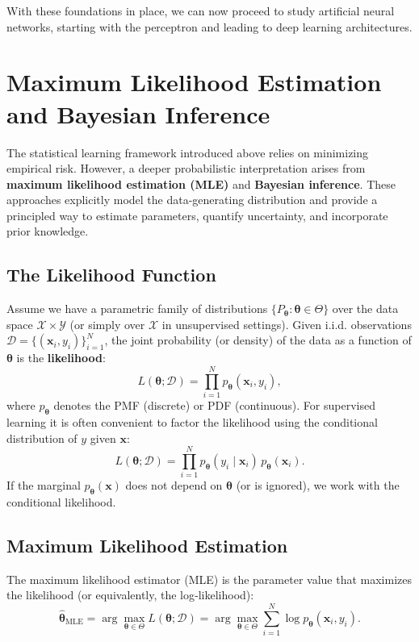 \documentclass{tufte-handout}
\begin{document}
With these foundations in place, we can now proceed to study artificial neural networks, starting with the perceptron and leading to deep learning architectures.

\section{Maximum Likelihood Estimation and Bayesian Inference}

The statistical learning framework introduced above relies on minimizing empirical risk. However, a deeper probabilistic interpretation arises from \textbf{maximum likelihood estimation (MLE)} and \textbf{Bayesian inference}. These approaches explicitly model the data-generating distribution and provide a principled way to estimate parameters, quantify uncertainty, and incorporate prior knowledge.

\subsection{The Likelihood Function}

Assume we have a parametric family of distributions $\{P_{\boldsymbol{\theta}} : \boldsymbol{\theta} \in \Theta\}$ over the data space $\mathcal{X} \times \mathcal{Y}$ (or simply over $\mathcal{X}$ in unsupervised settings). Given i.i.d. observations $\mathcal{D} = \{(\mathbf{x}_i, y_i)\}_{i=1}^{N}$, the joint probability (or density) of the data as a function of $\boldsymbol{\theta}$ is the \textbf{likelihood}:
\[
L(\boldsymbol{\theta}; \mathcal{D}) = \prod_{i=1}^{N} p_{\boldsymbol{\theta}}(\mathbf{x}_i, y_i),
\]
where $p_{\boldsymbol{\theta}}$ denotes the PMF (discrete) or PDF (continuous). For supervised learning it is often convenient to factor the likelihood using the conditional distribution of $y$ given $\mathbf{x}$:
\[
L(\boldsymbol{\theta}; \mathcal{D}) = \prod_{i=1}^{N} p_{\boldsymbol{\theta}}(y_i \mid \mathbf{x}_i) \, p_{\boldsymbol{\theta}}(\mathbf{x}_i).
\]
If the marginal $p_{\boldsymbol{\theta}}(\mathbf{x})$ does not depend on $\boldsymbol{\theta}$ (or is ignored), we work with the conditional likelihood.

\subsection{Maximum Likelihood Estimation}

\begin{defn}
    The maximum likelihood estimator (MLE) is the parameter value that maximizes the likelihood (or equivalently, the log‑likelihood):
    \[
    \hat{\boldsymbol{\theta}}_{\text{MLE}} = \arg\max_{\boldsymbol{\theta} \in \Theta} L(\boldsymbol{\theta}; \mathcal{D}) = \arg\max_{\boldsymbol{\theta} \in \Theta} \sum_{i=1}^{N} \log p_{\boldsymbol{\theta}}(\mathbf{x}_i, y_i).
    \]
\end{defn}
\end{document}
